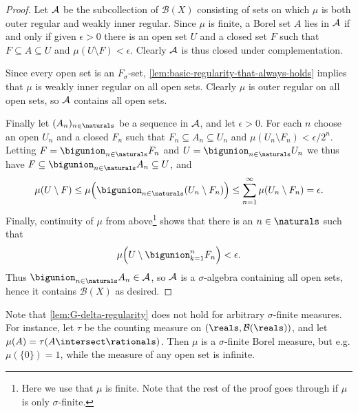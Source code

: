 \documentclass[article, a4paper, 11pt, oneside]{memoir}
\numberwithin{equation}{chapter}
\newcommand{\calB}{\mathcal{B}}
\newcommand{\borel}[1]{\calB(#1)}
\begin{document}
\begin{proof}
    Let $\mathcal{A}$ be the subcollection of $\borel{X}$ consisting of sets on which $\mu$ is both outer regular and weakly inner regular. Since $\mu$ is finite, a Borel set $A$ lies in $\mathcal{A}$ if and only if given $\epsilon > 0$ there is an open set $U$ and a closed set $F$ such that $F \subseteq A \subseteq U$ and $\mu(U \setminus F) < \epsilon$. Clearly $\mathcal{A}$ is thus closed under complementation.
    
    Since every open set is an $F_\sigma$-set, \cref{lem:basic-regularity-that-always-holds} implies that $\mu$ is weakly inner regular on all open sets. Clearly $\mu$ is outer regular on all open sets, so $\mathcal{A}$ contains all open sets.

    Finally let $(A_n)_{n \in \naturals}$ be a sequence in $\mathcal{A}$, and let $\epsilon > 0$. For each $n$ choose an open $U_n$ and a closed $F_n$ such that $F_n \subseteq A_n \subseteq U_n$ and $\mu(U_n \setminus F_n) < \epsilon/2^n$. Letting $F = \bigunion_{n \in \naturals} F_n$ and $U = \bigunion_{n \in \naturals} U_n$ we thus have $F \subseteq \bigunion_{n \in \naturals} A_n \subseteq U$, and
    \begin{equation*}
        \mu(U \setminus F)
            \leq \mu \Bigl( \bigunion_{n \in \naturals} (U_n \setminus F_n) \Bigr)
            \leq \sum_{n=1}^\infty \mu(U_n \setminus F_n)
            = \epsilon.
    \end{equation*}
    Finally, continuity of $\mu$ from above\footnote{Here we use that $\mu$ is finite. Note that the rest of the proof goes through if $\mu$ is only $\sigma$-finite.} shows that there is an $n \in \naturals$ such that
    \begin{equation*}
        \mu \Bigl( U \setminus \bigunion_{k=1}^n F_n \Bigr)
            < \epsilon.
    \end{equation*}
    Thus $\bigunion_{n \in \naturals} A_n \in \calA$, so $\mathcal{A}$ is a $\sigma$-algebra containing all open sets, hence it contains $\borel{X}$ as desired.
\end{proof}


\begin{remark}
    Note that \cref{lem:G-delta-regularity} does not hold for arbitrary $\sigma$-finite measures. For instance, let $\tau$ be the counting measure on $(\reals,\borel{\reals})$, and let $\mu(A) = \tau(A \intersect \rationals)$. Then $\mu$ is a $\sigma$-finite Borel measure, but e.g. $\mu(\{0\}) = 1$, while the measure of any open set is infinite.
\end{remark}
\end{document}
